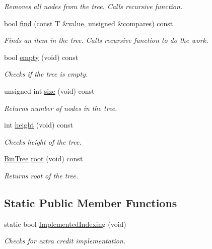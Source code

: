 \begin{DoxyCompactItemize}
\begin{DoxyCompactList}\small\item\em Removes all nodes from the tree. Calls recursive function. \end{DoxyCompactList}\item 
bool \hyperlink{classBSTree_a4c789a7e91d8a21074ae6ed6be42ac4a}{find} (const T \&value, unsigned \&compares) const 
\begin{DoxyCompactList}\small\item\em Finds an item in the tree. Calls recursive function to do the work. \end{DoxyCompactList}\item 
bool \hyperlink{classBSTree_aef431a55bc9069dcd17c15b4ddacf48e}{empty} (void) const 
\begin{DoxyCompactList}\small\item\em Checks if the tree is empty. \end{DoxyCompactList}\item 
unsigned int \hyperlink{classBSTree_acaf31244510bb689f8bf1cf83fb4b212}{size} (void) const 
\begin{DoxyCompactList}\small\item\em Returns number of nodes in the tree. \end{DoxyCompactList}\item 
int \hyperlink{classBSTree_a4f2b0cd077e99415954cf1162c282306}{height} (void) const 
\begin{DoxyCompactList}\small\item\em Checks height of the tree. \end{DoxyCompactList}\item 
\hyperlink{classBSTree_ae961195e523a45be64a981840e953b67}{Bin\-Tree} \hyperlink{classBSTree_a84c029bf53eb4e50b4d14f610a46ef2a}{root} (void) const 
\begin{DoxyCompactList}\small\item\em Returns root of the tree. \end{DoxyCompactList}\end{DoxyCompactItemize}
\subsection*{Static Public Member Functions}
\begin{DoxyCompactItemize}
\item 
static bool \hyperlink{classBSTree_afed4448d4cf9b7cf36bf0efb79405931}{Implemented\-Indexing} (void)
\begin{DoxyCompactList}\small\item\em Checks for extra credit implementation. \end{DoxyCompactList}\end{DoxyCompactItemize}
